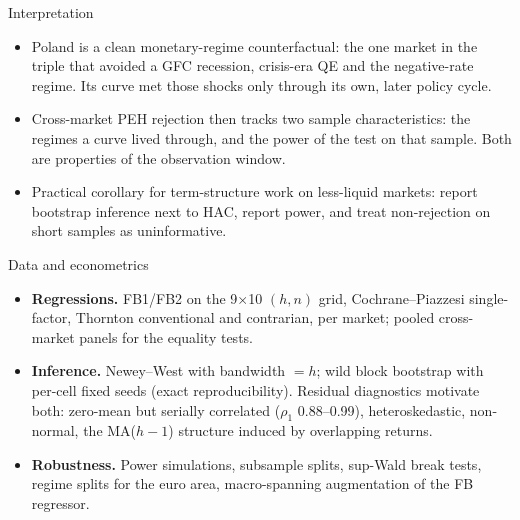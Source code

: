 \documentclass[aspectratio=169,11pt]{beamer}
\begin{document}
\begin{frame}{Interpretation}
  \small
  \begin{itemize}
    \item Poland is a clean monetary-regime counterfactual: the one market in
          the triple that avoided a GFC recession, crisis-era QE and the
          negative-rate regime. Its curve met those shocks only through its
          own, later policy cycle.
    \item Cross-market PEH rejection then tracks two sample characteristics:
          the regimes a curve lived through, and the power of the test on that
          sample. Both are properties of the observation window.
    \item Practical corollary for term-structure work on less-liquid markets:
          report bootstrap inference next to HAC, report power, and treat
          non-rejection on short samples as uninformative.
  \end{itemize}
\end{frame}

\begin{frame}{Data and econometrics}
  \small
  \begin{itemize}
    \item \textbf{Regressions.} FB1/FB2 on the 9$\times$10 $(h,n)$ grid,
          Cochrane--Piazzesi single-factor, Thornton conventional and
          contrarian, per market; pooled cross-market panels for the equality
          tests.
    \item \textbf{Inference.} Newey--West with bandwidth $=h$; wild block
          bootstrap with per-cell fixed seeds (exact reproducibility).
          Residual diagnostics motivate both: zero-mean but serially
          correlated ($\rho_1$ 0.88--0.99), heteroskedastic, non-normal, the
          MA($h{-}1$) structure induced by overlapping returns.
    \item \textbf{Robustness.} Power simulations, subsample splits,
          sup-Wald break tests, regime splits for the euro area,
          macro-spanning augmentation of the FB regressor.
  \end{itemize}
\end{frame}
\end{document}
